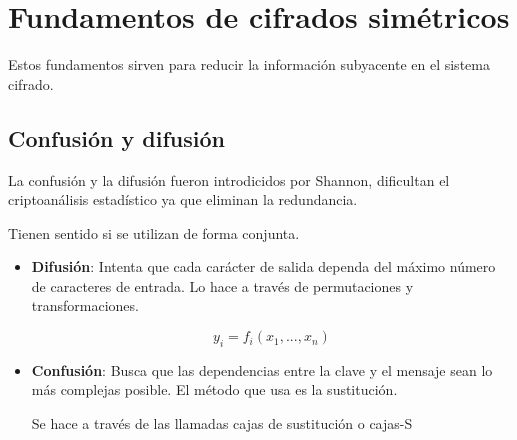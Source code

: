 \section{Fundamentos de cifrados simétricos}
Estos fundamentos sirven para reducir la información subyacente en el sistema cifrado.
\subsection{Confusión y difusión}
 La confusión y la difusión fueron introdicidos por Shannon, dificultan el criptoanálisis estadístico ya que  eliminan la redundancia.
 
 Tienen sentido si se utilizan de forma conjunta.
 
 \begin{itemize}
 	\item \textbf{Difusión}: Intenta que cada carácter de salida dependa del máximo número de caracteres de entrada. Lo hace a través de permutaciones y transformaciones.
 	
 	$$y_i = f_i(x_1,...,x_n)$$
 	
 	\item \textbf{Confusión}: Busca que las dependencias entre la clave y el mensaje sean lo más complejas posible. El método que usa es la sustitución. 
 	
 	Se hace a través de las llamadas cajas de sustitución o cajas-S
 \end{itemize}
 
